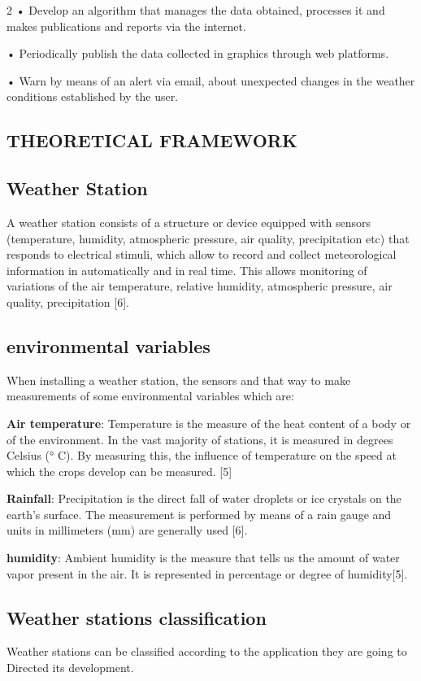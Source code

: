 \documentclass{article}
\begin{document}
\begin{multicols} {2}
• Develop an algorithm that manages the data obtained, processes it and makes publications and reports via the internet.

• Periodically publish the data collected in graphics through web platforms.

• Warn by means of an alert via email, about unexpected changes in the weather conditions established by the user.

\begin{center}
\section{THEORETICAL FRAMEWORK}
\end{center}
\subsection{Weather Station}
A weather station consists of a structure or device equipped with sensors
(temperature, humidity, atmospheric pressure, air quality, precipitation etc) that responds
to electrical stimuli, which allow to record and collect meteorological information in
automatically and in real time. This allows monitoring of variations of the
air temperature, relative humidity, atmospheric pressure, air quality, precipitation [6].

\subsection{environmental variables}
When installing a weather station, the sensors and
that way to make measurements of some environmental variables which are:

\textbf{Air temperature}: Temperature is the measure of the heat content of a body
or of the environment. In the vast majority of stations, it is measured in degrees Celsius (° C).
By measuring this, the influence of temperature on the speed at which the crops develop can be measured. [5]

\textbf{Rainfall}: Precipitation is the direct fall of water droplets or ice crystals on the earth's surface. The measurement is performed by means of a rain gauge and units in millimeters (mm) are generally used [6].

\textbf{humidity}: Ambient humidity is the measure that tells us the amount of water vapor present in the air. It is represented in percentage or degree of humidity[5].

\subsection{Weather stations classification}
Weather stations can be classified according to the application they are going to Directed its development.


\end{multicols}
\end{document}
